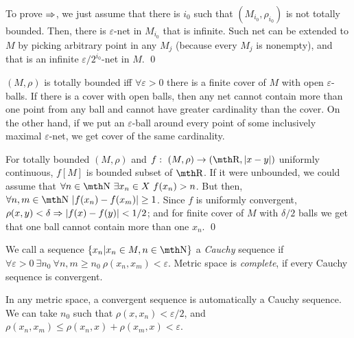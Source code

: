 To prove $\Rightarrow$, we just assume that there is $i_0$ such that 
$(M_{i_0},\rho_{i_0})$ is not totally bounded. Then, there is 
$\varepsilon$-net in $M_{i_0}$ that is infinite. Such net can 
be extended to $M$ by picking arbitrary point in any $M_j$ 
(because every $M_j$ is nonempty), and that is an infinite 
$\varepsilon/2^{i_0}$-net in $M$. 
\qed

\smallskip
$(M,\rho)$ is totally bounded iff $\forall \varepsilon >0$ 
there is a finite cover of $M$ with open $\varepsilon$-balls.
If there is a cover with open balls, then any net cannot contain more 
than one point from any ball and cannot have greater cardinality 
than the cover. On the other hand, if we put an $\varepsilon$-ball 
around every point of some inclusively maximal $\varepsilon$-net, 
we get cover of the same cardinality.

\smallskip
For totally bounded $(M,\rho)$ and $f:\ (M,\rho)\to (\R,|x-y|)$ uniformly 
continuous, $f[M]$ is bounded subset of $\R$. If it were unbounded, 
we could assume that $\forall n\in \N\ \exists x_n\in X\ f(x_n)>n$. 
But then, $\forall n,m\in \N\ |f(x_n)-f(x_m)|\geq 1$. Since $f$ is 
uniformly convergent, $\rho(x,y)< \delta \Rightarrow |f(x)-f(y)|<1/2$; and 
for finite cover of $M$ with $\delta/2$ balls we get that one ball 
cannot contain more than one $x_n$.
\qed

\medskip

 We call a sequence $\{x_n|x_n \in M, n\in \N\}$ 
a {\it Cauchy} sequence if $\forall \varepsilon>0\ \exists n_0\ \forall n,m\geq n_0
\ \rho(x_n,x_m) < \varepsilon$. Metric space is {\it complete}, if every Cauchy 
sequence is convergent. 

In any metric space, a convergent sequence is automatically a Cauchy sequence. 
We can take $n_0$ such that $\rho(x,x_n) < \varepsilon/2$, and $\rho(x_n,x_m) 
\leq \rho(x_n,x) + \rho(x_m,x) < \varepsilon$.


